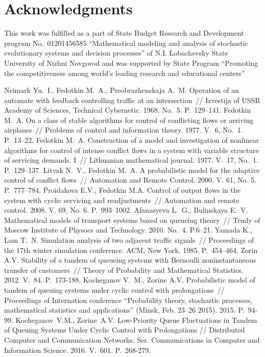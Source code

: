 \documentclass[runningheads,a4paper]{llncs}
\begin{document}
\section{Acknowledgments}
This work was fulfilled as a part of State Budget Research and Development program No.~01201456585
``Mathematical modeling and analysis of stochastic evolutionary systems and decision processes'' of
N.I. Lobachevsky State University of Nizhni Novgorod and was supported by State Program ``Promoting
the competitiveness among world's leading research and educational centers''



\begin{thebibliography}{10}
 Neimark Yu.~I., Fedotkin M.~A., Preobrazhenskaja A.~M. Operation of an automate
  with feedback controlling traffic at an intersection~// Izvestija of USSR Academy of Sciences,
  Technical Cybernetic. 1968. No.~5. P.~129--141.
  Fedotkin M.~A. On a class of stable algorithms for control of conflicting flows or arriving
  airplanes~// Problems of control and information theory. 1977. V.~6, No.~1. P.~13--22.
  Fedotkin M.~A. Construction of a model and investigation of nonlinear algorithms for control of
  intense conflict flows in a system with variable structure of servicing demands. I~// Lithuanian
  mathematical journal. 1977. V.~17, No.~1. P.~129--137.
%
  Litvak N.~V., Fedotkin M.~A. A probabilistic model for the
  adaptive control of conflict flows~// Automation and Remote Control. 2000. V. 61, No. 5. P.~777--784.
%
  Proidakova E.V., Fedotkin M.A. Control of output flows in the system with cyclic servicing and
  readjustments~// Automation and remote control. 2008. V. 69, No. 6. P.~993--1002.
%
  Afanasyeva L.~G., Bulinskaya E.~V. Mathematical models of transport systems based on queueing
  theory~// Trudy of Moscow Institute of Physocs and Technology. 2010. No.~4. P.6--21. 
  Yamada K., Lam T.~N. Simulation analysis of two adjacent traffic signals~// Proceedings of the
  17th winter simulation conference. ACM, New York. 1985. P.~454--464.
%
  Zorin A.V. Stability of a tandem of queueing systems with Bernoulli noninstantaneous transfer of
  customers~// Theory of Probability and Mathematical Statistics. 2012. V.~84. P.~173-188.
  Kocheganov V.~M., Zorine A.V. Probabilistic model of tandem of queuing systems under cyclic
  control with prolongations~// Proceedings of Internation conference ``Probability theory, stochastic processes, mathematical statistics
  and applications'' (Minsk, Feb. 23--26 2015). 2015. P.~94-99.
Kocheganov~V.M., Zorine~A.V. Low-Priority Queue Fluctuations in Tandem of Queuing Systems Under Cyclic Control with Prolongations // Distributed Computer and Communication Networks. Ser. Communications in Computer and Information Science. 2016. V.~601. P.~268-279.
\end{thebibliography}
\end{document}
